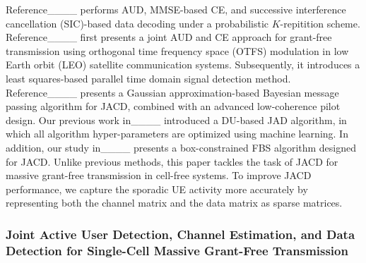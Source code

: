 %
Reference____ performs AUD, MMSE-based CE, and successive interference cancellation (SIC)-based data decoding under a probabilistic $K$-repitition scheme.
%
Reference____ first presents a joint AUD and CE approach for grant-free transmission using orthogonal time frequency space (OTFS) modulation in low Earth orbit (LEO) satellite communication systems. 
Subsequently, it introduces a least squares-based parallel time domain signal detection method.
%
Reference____ presents a Gaussian approximation-based Bayesian message passing algorithm for JACD, combined with an advanced low-coherence pilot design. 
%
Our previous work in____ introduced a DU-based JAD algorithm, in which all algorithm hyper-parameters are optimized using machine learning. 
%
In addition, our study in____ presents a box-constrained FBS algorithm designed for JACD.
%
Unlike previous methods, this paper tackles the task of JACD for massive grant-free transmission in cell-free systems. 
%
To improve JACD performance, we capture the sporadic UE activity more accurately by representing both the channel matrix and the data matrix as sparse matrices.


\subsubsection{Joint Active User Detection, Channel Estimation, and Data Detection for Single-Cell Massive Grant-Free Transmission}

